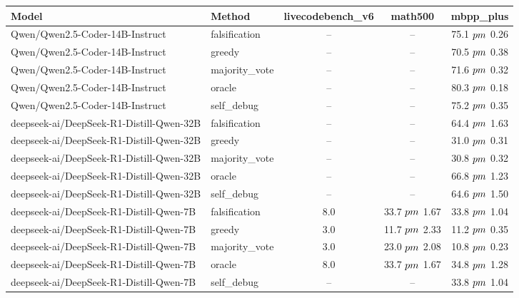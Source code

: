 \begin{tabular}{llccc}
\toprule
Model & Method & livecodebench_v6 & math500 & mbpp_plus \\
\midrule
Qwen/Qwen2.5-Coder-14B-Instruct & falsification & -- & -- & 75.1 $\\pm$ 0.26 \\
Qwen/Qwen2.5-Coder-14B-Instruct & greedy & -- & -- & 70.5 $\\pm$ 0.38 \\
Qwen/Qwen2.5-Coder-14B-Instruct & majority_vote & -- & -- & 71.6 $\\pm$ 0.32 \\
Qwen/Qwen2.5-Coder-14B-Instruct & oracle & -- & -- & 80.3 $\\pm$ 0.18 \\
Qwen/Qwen2.5-Coder-14B-Instruct & self_debug & -- & -- & 75.2 $\\pm$ 0.35 \\
deepseek-ai/DeepSeek-R1-Distill-Qwen-32B & falsification & -- & -- & 64.4 $\\pm$ 1.63 \\
deepseek-ai/DeepSeek-R1-Distill-Qwen-32B & greedy & -- & -- & 31.0 $\\pm$ 0.31 \\
deepseek-ai/DeepSeek-R1-Distill-Qwen-32B & majority_vote & -- & -- & 30.8 $\\pm$ 0.32 \\
deepseek-ai/DeepSeek-R1-Distill-Qwen-32B & oracle & -- & -- & 66.8 $\\pm$ 1.23 \\
deepseek-ai/DeepSeek-R1-Distill-Qwen-32B & self_debug & -- & -- & 64.6 $\\pm$ 1.50 \\
deepseek-ai/DeepSeek-R1-Distill-Qwen-7B & falsification & 8.0 & 33.7 $\\pm$ 1.67 & 33.8 $\\pm$ 1.04 \\
deepseek-ai/DeepSeek-R1-Distill-Qwen-7B & greedy & 3.0 & 11.7 $\\pm$ 2.33 & 11.2 $\\pm$ 0.35 \\
deepseek-ai/DeepSeek-R1-Distill-Qwen-7B & majority_vote & 3.0 & 23.0 $\\pm$ 2.08 & 10.8 $\\pm$ 0.23 \\
deepseek-ai/DeepSeek-R1-Distill-Qwen-7B & oracle & 8.0 & 33.7 $\\pm$ 1.67 & 34.8 $\\pm$ 1.28 \\
deepseek-ai/DeepSeek-R1-Distill-Qwen-7B & self_debug & -- & -- & 33.8 $\\pm$ 1.04 \\
\bottomrule
\end{tabular}
